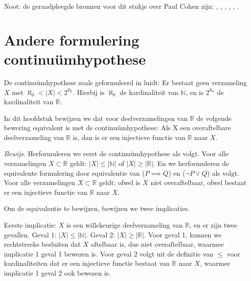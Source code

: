 \documentclass[hidelinks,11pt,a4paper]{article}
\begin{document}
Noot: de geraadpleegde bronnen voor dit stukje over Paul Cohen zijn:
\cite{wiki_en_cohen}, \cite{wiki_nl_cohen}, \cite{sarnak}, \cite{wiki_nl_fields}, \cite{wiki_en_cont}, \cite{wiki_en_hilb23}. 

\section{Andere formulering continu\"umhypothese}
\label{sec_conthyp}


De continu\"umhypothese zoals geformuleerd in \cite{bew&red} luidt: 
Er bestaat geen verzameling $X$ met $\aleph_0 < |X| < 2^{\aleph_0}$. 
Hierbij is $\aleph_0$ de kardinaliteit van $\mathbb{N}$, en is $2^{\aleph_0}$ de kardinaliteit van $\mathbb{R}$. 

In dit hoofdstuk bewijzen we dat voor deelverzamelingen van $\mathbb{R}$ de volgende bewering equivalent is met de continu\"umhypothese: 
Als X een overaftelbare deelverzameling van $\mathbb{R}$ is, dan is er een injectieve functie van $\mathbb{R}$ naar $X$.

\emph{Bewijs.} Herformuleren we eerst de continu\"umhypothese als volgt. Voor alle verzamelingen $X \subset \mathbb{R}$ geldt: 
$|X| \leq |\mathbb{N}| $ of $|X| \geq |\mathbb{R}|$. En we herformuleren de equivalente formulering door equivalentie van ($P \implies Q$) en ($\neg P \lor Q$) als volgt. Voor alle verzamelingen $X \subset \mathbb{R}$ geldt: ofwel is $X$ niet overaftelbaar, ofwel bestaat er een injectieve functie van $\mathbb{R}$ naar $X$. 

Om de equivalentie te bewijzen, bewijzen we twee implicaties.  

Eerste implicatie: $X$ is een willekeurige deelverzameling van  $\mathbb{R}$, en er zijn twee gevallen. 
Geval 1: $|X| \leq |\mathbb{N}| $. 
Geval 2: $|X| \geq |\mathbb{R}|$. 
Voor geval 1, kunnen we rechtstreeks besluiten dat $X$ aftelbaar is, dus niet overaftelbaar, waarmee implicatie 1 geval 1 bewezen is. 
Voor geval 2 volgt uit de definitie van $\leq$ voor kardinaliteiten dat er een injectieve functie bestaat van $\mathbb{R}$ naar $X$, waarmee implicatie 1 geval 2 ook bewezen is. 
\end{document}
